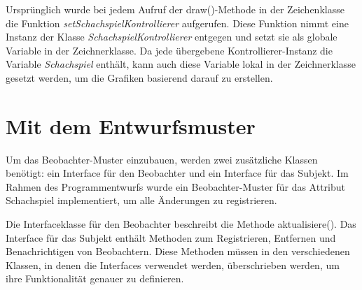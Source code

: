Ursprünglich wurde bei jedem Aufruf der draw()-Methode in der Zeichenklasse die Funktion \textit{setSchachspielKontrollierer} aufgerufen. 
Diese Funktion nimmt eine Instanz der Klasse \textit{SchachspielKontrollierer} entgegen und setzt sie als globale Variable in der Zeichnerklasse. 
Da jede übergebene Kontrollierer-Instanz die Variable \textit{Schachspiel} enthält, kann auch diese Variable lokal in der Zeichnerklasse gesetzt werden, um die Grafiken basierend darauf zu erstellen.

\newpage

\section{Mit dem Entwurfsmuster}

Um das Beobachter-Muster einzubauen, werden zwei zusätzliche Klassen benötigt: ein Interface für den Beobachter und ein Interface für das Subjekt. 
Im Rahmen des Programmentwurfs wurde ein Beobachter-Muster für das Attribut \glqq Schachspiel\grqq{} implementiert, um alle Änderungen zu registrieren.

Die Interfaceklasse für den Beobachter beschreibt die Methode \glqq aktualisiere()\grqq. 
Das Interface für das Subjekt enthält Methoden zum Registrieren, Entfernen und Benachrichtigen von Beobachtern. 
Diese Methoden müssen in den verschiedenen Klassen, in denen die Interfaces verwendet werden, überschrieben werden, um ihre Funktionalität genauer zu definieren.

